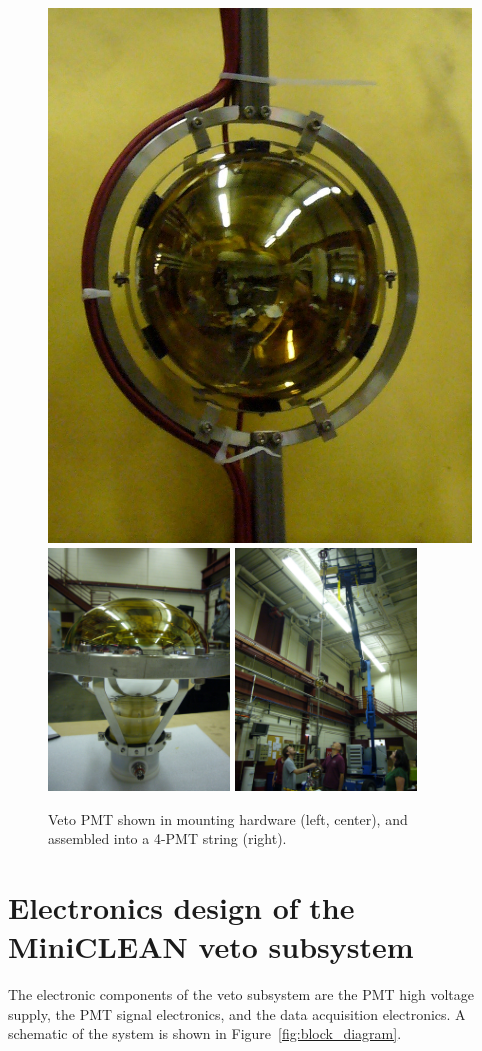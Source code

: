 \documentclass[review,number,sort&compress]{elsarticle}
\begin{document}
\begin{figure}[ht]
\begin{center}
\includegraphics[width=2.in]{graphics/singlepmtmounted1.JPG}
\includegraphics[width=1.9in]{graphics/singlepmtmounted2.JPG}
\includegraphics[width=1.9in]{graphics/pmtstring.JPG}
\caption{Veto PMT shown in mounting hardware (left, center), and assembled into a 4-PMT string (right).
\label{fig:vetopmtmountpic}}
\end{center}
\end{figure}


\section{Electronics design of the MiniCLEAN veto subsystem}
\label{sec:electronics_design}
%
The electronic components of the veto subsystem are the PMT high
voltage supply, the PMT signal electronics, and the data acquisition
electronics. A schematic of the system is shown in
Figure~\ref{fig:block_diagram}.
\end{document}
